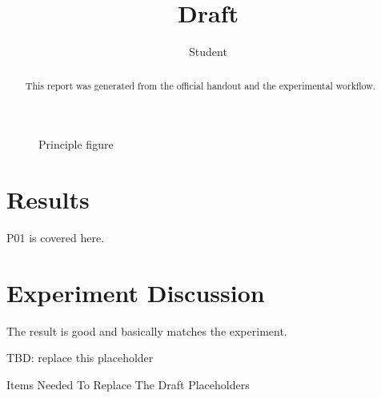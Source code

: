 \begin{abstract}
This report was generated from the official handout and the experimental workflow.
\end{abstract}

\title{Draft}

\author{Student}



\begin{figure}[H]
\caption{Principle figure}
\label{fig:principle-01}
\end{figure}

\section{Results}
P01 is covered here.

\section{Experiment Discussion}
The result is good and basically matches the experiment.

TBD: replace this placeholder

\appendix
Items Needed To Replace The Draft Placeholders
